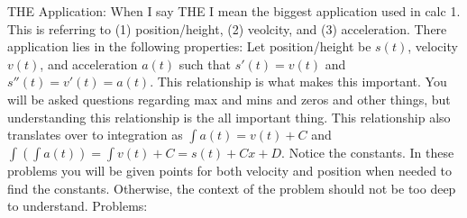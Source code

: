 \documentclass[10pt]{article}
\theoremstyle{Theorem}
\theoremstyle{definition}
\theoremstyle{remark}
\theoremstyle{custom}
\begin{document}
THE Application: When I say THE I mean the biggest application used in calc 1. This is referring to (1) position/height, (2) veolcity, and (3) acceleration. There application lies in the following properties: Let position/height be $s(t)$, velocity $v(t)$, and acceleration $a(t)$ such that $s'(t)=v(t)$ and $s''(t)=v'(t)=a(t)$. This relationship is what makes this important. You will be asked questions regarding max and mins and zeros and other things, but understanding this relationship is the all important thing. This relationship also translates over to integration as $\int a(t)=v(t)+C$ and $\int\left(\int a(t)\right) =\int v(t) +C=s(t)+Cx+D$. Notice the constants. In these problems you will be given points for both velocity and position when needed to find the constants.  Otherwise, the context of the problem should not be too deep to understand. 
\newpage
\noindent Problems:
\end{document}
